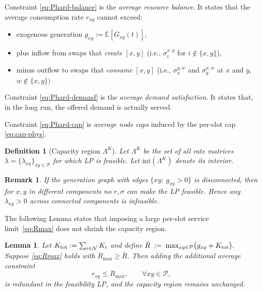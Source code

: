 \documentclass[11pt]{article}
\newtheorem{lemma}{Lemma}
\newtheorem{definition}{Definition}
\newtheorem{remark}{Remark}
\newcommand{\E}{\mathbb{E}}
\newcommand{\Ncal}{\mathcal{N}}
\newcommand{\Pairs}{\mathcal{P}} %
\begin{document}
Constraint \eqref{eq:Phard-balance} is the \textit{average resource balance}. It states that the average consumption rate $r_{xy}$ cannot exceed:
\begin{itemize}[leftmargin=2em]
\item exogenous generation $g_{xy} := \E[G_{xy}(t)]$,
\item plus inflow from swaps that \emph{create} $[x,y]$ (i.e., $\sigma_i^{x,y}$ for $i\notin\{x,y\}$),
\item minus outflow to swaps that \emph{consume} $[x,y]$ (i.e., $\sigma_x^{y,w}$ and $\sigma_y^{x,w}$ at $x$ and $y$,  $w\notin\{x,y\})$
\end{itemize}


Constraint \eqref{eq:Phard-demand} is the \textit{average demand satisfaction}. It states that, in the long run, the offered demand is actually served.

Constraint \eqref{eq:Phard-cap} is \textit{average node caps} induced by the per-slot cap \eqref{eq:cap-phys}.



\begin{definition}[Capacity region $\Lambda^K$]
Let $\Lambda^K$ be the set of all rate matrices $\lambda=\{\lambda_{xy}\}_{xy\in\Pairs}$ for which {\rm LP} is feasible. Let $\mathrm{int}(\Lambda^K)$ denote its interior.
\end{definition}
\begin{remark}
If the generation graph with edges $\{xy:\ g_{xy}>0\}$ is disconnected, then for $x,y$ in different components no $r, \sigma$ can make the LP feasible. Hence any $\lambda_{xy}>0$ across connected components is infeasible. 
\end{remark}
The following Lemma states that imposing a large per-slot service limit~\eqref{eq:Rmax} does not shrink the capacity region. 

\begin{lemma}
\label{lem:Rmax-redundant}
Let $K_{\rm tot} := \sum_{i\in\Ncal} K_i$ and define
$\bar R
\;:=\;
\max_{xy\in\Pairs} \bigl( g_{xy} + K_{\rm tot} \bigr).
$
Suppose \eqref{eq:Rmax} holds with $R_{\max} \ge \bar R$. Then adding the additional average constraint
\[
r_{xy} \le R_{\max}, \qquad \forall xy\in\Pairs,
\]
is redundant in the feasibility LP, and the capacity region remains unchanged.
\end{lemma}
\end{document}
